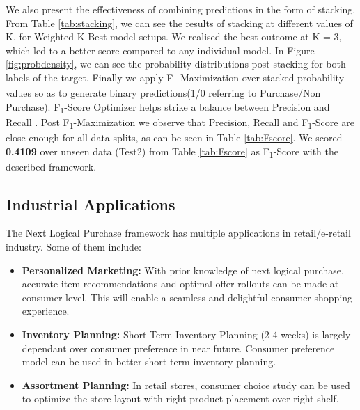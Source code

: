 We also present the effectiveness of combining predictions in the form of stacking. From Table \ref{tab:stacking}, we can see the 
results of stacking at different values of K, for Weighted K-Best model setups. We realised the best outcome at 
K = 3, which led to a better score compared to any individual model.
In Figure \ref{fig:probdensity}, we can see the probability distributions post stacking for both labels of the target.
Finally we apply F\textsubscript{1}-Maximization over stacked probability values so as to generate 
binary predictions(1/0 referring to Purchase/Non Purchase). F\textsubscript{1}-Score Optimizer helps strike a 
balance between Precision and Recall \cite{buckland1994relationship}. Post F\textsubscript{1}-Maximization we 
observe that Precision, Recall and F\textsubscript{1}-Score are close enough for all data splits, as can be seen 
in Table \ref{tab:Fscore}. We scored {\bf 0.4109} over unseen data (Test2)
from Table \ref{tab:Fscore} as F\textsubscript{1}-Score with the described framework.
\subsection{Industrial Applications}
The Next Logical Purchase framework has multiple applications in retail/e-retail industry. Some of them 
include:
\begin{itemize}
\item {\bf Personalized Marketing:} With prior knowledge of next logical purchase, accurate item recommendations and 
optimal offer rollouts can be made at consumer level. This will enable a seamless and delightful consumer 
shopping experience.
\item {\bf Inventory Planning:} Short Term Inventory Planning (2-4 weeks) is largely dependant over 
consumer preference in near future. Consumer preference model can be used in better short term inventory planning.
\item {\bf Assortment Planning:} In retail stores, consumer choice study can be used to optimize the store 
layout with right product placement over right shelf.
\end{itemize}
